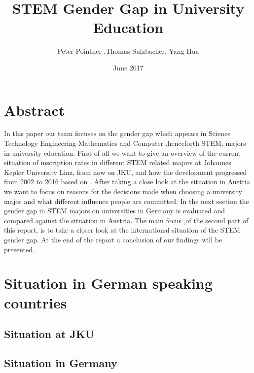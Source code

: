 \documentclass[12pt]{article}
\title{STEM Gender Gap in University Education}
\date{June 2017}
\author{Peter Pointner ,Thomas Sulzbacher, Yang Hua}
\begin{document}
	\maketitle
	\newpage
	
	\tableofcontents
	\newpage
	\section{Abstract}
In this paper our team focuses on the gender gap which appears in Science Technology Engineering Mathematics and Computer ,henceforth STEM, majors in university education. First of all we want to give an overview of the current situation of inscription rates in different STEM related majors at Johannes Kepler University Linz, from now on  JKU, and how the development progressed from 2002 to 2016 based on \cite{studienwahl_jku} \cite{eq_1} \cite{eq_2} \cite{eq_3}. After taking a close look at the situation in Austria we want to focus on reasons for the decisions made when choosing a university major and what different influence people are committed.
In the next section the gender gap in STEM majors on universities in Germany is evaluated and compared against the situation in Austria. The main focus ,of the second part of this report, is to take a closer look at the international situation of the STEM gender gap. At the end of the report a conclusion of our findings will be presented.    
 	\section{Situation in German speaking countries}
	\subsection{Situation at JKU}
	\subsection{Situation in Germany}

\newpage


\newpage
\listoffigures
\listoftables
\end{document}
